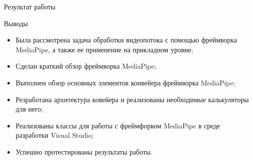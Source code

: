 \documentclass[aspectratio=169,xcolor=dvipsnames]{beamer}
\begin{document}

\begin{frame}{Результат работы}
    \begin{figure}[h]
        \label{ris:subgraph}
    \end{figure}
\end{frame}


\begin{frame}{Выводы}
    \begin{itemize}
        \item Была рассмотрена задача обработки видеопотока с помощью фреймворка MediaPipe, а также ее применение на прикладном уровне;
        \item Сделан краткий обзор фреймворка MediaPipe;
        \item Выполнен обзор основных элементов конвейера фреймворка MediaPipe;
        \item Резработана архитектура ковейера и реализованы необходимые калькуляторы для него;
        \item Реализованы классы для работы с фреймфорком MediaPipe в среде разработки Visual Studio;
        \item Успешно протестированы результаты работы.
    \end{itemize}
\end{frame}

\end{document}
